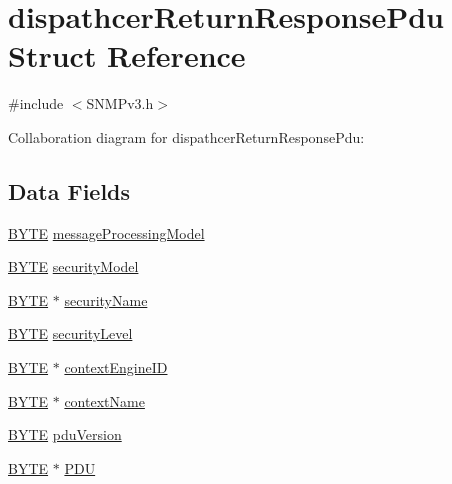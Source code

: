\hypertarget{structdispathcer_return_response_pdu}{}\section{dispathcer\+Return\+Response\+Pdu Struct Reference}
\label{structdispathcer_return_response_pdu}


{\ttfamily \#include $<$S\+N\+M\+Pv3.\+h$>$}



Collaboration diagram for dispathcer\+Return\+Response\+Pdu\+:
\subsection*{Data Fields}
\begin{DoxyCompactItemize}
\item 
\hyperlink{_generic_type_defs_8h_a4ae1dab0fb4b072a66584546209e7d58}{B\+Y\+T\+E} \hyperlink{structdispathcer_return_response_pdu_a47f1a1b8f7a3fe5623fe37df094ac032}{message\+Processing\+Model}
\item 
\hyperlink{_generic_type_defs_8h_a4ae1dab0fb4b072a66584546209e7d58}{B\+Y\+T\+E} \hyperlink{structdispathcer_return_response_pdu_ac19ed44216346e9d6c50819813db6867}{security\+Model}
\item 
\hyperlink{_generic_type_defs_8h_a4ae1dab0fb4b072a66584546209e7d58}{B\+Y\+T\+E} $\ast$ \hyperlink{structdispathcer_return_response_pdu_a4a48a8746988a1f761c3e9eadcc20463}{security\+Name}
\item 
\hyperlink{_generic_type_defs_8h_a4ae1dab0fb4b072a66584546209e7d58}{B\+Y\+T\+E} \hyperlink{structdispathcer_return_response_pdu_a9314d7b462ce4cc59202ed48fcdd9945}{security\+Level}
\item 
\hyperlink{_generic_type_defs_8h_a4ae1dab0fb4b072a66584546209e7d58}{B\+Y\+T\+E} $\ast$ \hyperlink{structdispathcer_return_response_pdu_aa75baf2d001f5d5ac415eed279fd6e85}{context\+Engine\+I\+D}
\item 
\hyperlink{_generic_type_defs_8h_a4ae1dab0fb4b072a66584546209e7d58}{B\+Y\+T\+E} $\ast$ \hyperlink{structdispathcer_return_response_pdu_af55ce5882ccbc8435fb33f1020c74550}{context\+Name}
\item 
\hyperlink{_generic_type_defs_8h_a4ae1dab0fb4b072a66584546209e7d58}{B\+Y\+T\+E} \hyperlink{structdispathcer_return_response_pdu_a731491a51ee1a2971e5cd7d7446c1dab}{pdu\+Version}
\item 
\hyperlink{_generic_type_defs_8h_a4ae1dab0fb4b072a66584546209e7d58}{B\+Y\+T\+E} $\ast$ \hyperlink{structdispathcer_return_response_pdu_abf0d7b0afb4ebcedb2a0138c9b14fdb5}{P\+D\+U}

\end{DoxyCompactItemize}
